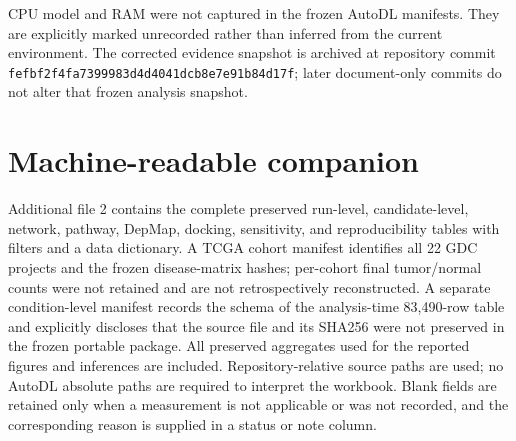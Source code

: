 \documentclass[10pt]{article}
\begin{document}


CPU model and RAM were not captured in the frozen AutoDL manifests. They are explicitly marked unrecorded rather than inferred from the current environment. The corrected evidence snapshot is archived at repository commit \texttt{fefbf2f4fa7399983d4d4041dcb8e7e91b84d17f}; later document-only commits do not alter that frozen analysis snapshot.

\section{Machine-readable companion}

Additional file 2 contains the complete preserved run-level, candidate-level, network, pathway, DepMap, docking, sensitivity, and reproducibility tables with filters and a data dictionary. A TCGA cohort manifest identifies all 22 GDC projects and the frozen disease-matrix hashes; per-cohort final tumor/normal counts were not retained and are not retrospectively reconstructed. A separate condition-level manifest records the schema of the analysis-time 83,490-row table and explicitly discloses that the source file and its SHA256 were not preserved in the frozen portable package. All preserved aggregates used for the reported figures and inferences are included. Repository-relative source paths are used; no AutoDL absolute paths are required to interpret the workbook. Blank fields are retained only when a measurement is not applicable or was not recorded, and the corresponding reason is supplied in a status or note column.
\end{document}
